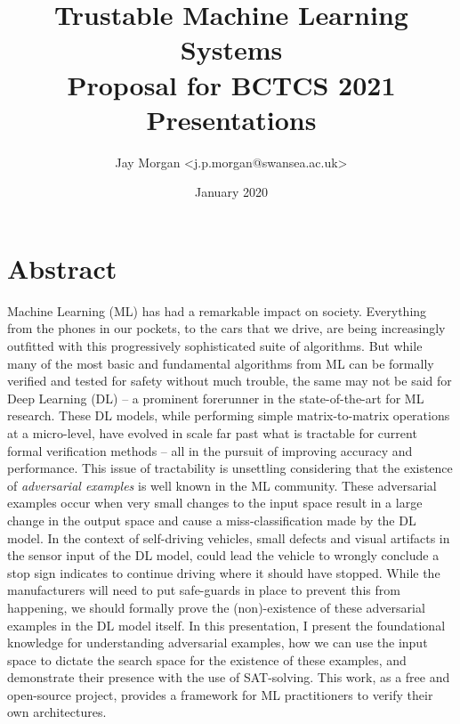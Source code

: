\documentclass[11pt]{article}
\author{Jay Morgan <j.p.morgan@swansea.ac.uk>}
\date{January 2020}
\title{Trustable Machine Learning Systems\\\medskip
\large Proposal for BCTCS 2021 Presentations}
\begin{document}
\maketitle

\section*{Abstract}
\label{sec:org34362dc}
Machine Learning (ML) has had a remarkable impact on society. Everything from the
phones in our pockets, to the cars that we drive, are being increasingly outfitted
with this progressively sophisticated suite of algorithms. But while many of the most
basic and fundamental algorithms from ML can be formally verified and tested for
safety without much trouble, the same may not be said for Deep Learning (DL) -- a
prominent forerunner in the state-of-the-art for ML research. These DL models, while
performing simple matrix-to-matrix operations at a micro-level, have evolved in scale
far past what is tractable for current formal verification methods -- all in the
pursuit of improving accuracy and performance. This issue of tractability is
unsettling considering that the existence of \emph{adversarial examples} is well known in
the ML community. These adversarial examples occur when very small changes to the
input space result in a large change in the output space and cause a
miss-classification made by the DL model. In the context of self-driving vehicles,
small defects and visual artifacts in the sensor input of the DL model, could lead
the vehicle to wrongly conclude a stop sign indicates to continue driving where it
should have stopped. While the manufacturers will need to put safe-guards in
place to prevent this from happening, we should formally prove the (non)-existence of
these adversarial examples in the DL model itself. In this presentation, I present
the foundational knowledge for understanding adversarial examples, how we can use the
input space to dictate the search space for the existence of these examples, and
demonstrate their presence with the use of SAT-solving. This work, as a free and
open-source project, provides a framework for ML practitioners to verify their own
architectures.
\end{document}
